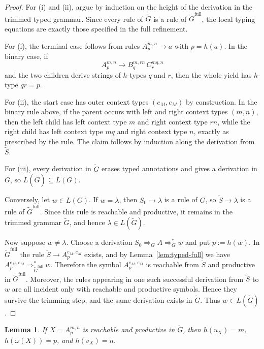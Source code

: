 \documentclass[11pt,a4paper]{article}
\newtheorem{lemma}[theorem]{Lemma}
\begin{document}
\begin{proof}
For \textup{(i)} and \textup{(ii)}, argue by induction on the height of
the derivation in the trimmed typed grammar. Since every rule of
$\widetilde G$ is a rule of $\widetilde G^{\mathrm{full}}$, the local
typing equations are exactly those specified in the full refinement.

For \textup{(i)}, the terminal case follows from rules
$A_p^{m,n}\to a$ with $p=h(a)$. In the binary case, if
\[
  A_p^{m,n}\to B_q^{m,rn}\,C_r^{mq,n}
\]
and the two children derive strings of $h$-types $q$ and $r$, then the
whole yield has $h$-type $qr=p$.

For \textup{(ii)}, the start case has outer context types
$(e_M,e_M)$ by construction. In the binary rule above, if the parent
occurs with left and right context types $(m,n)$, then the left child
has left context type $m$ and right context type $rn$, while the right
child has left context type $mq$ and right context type $n$, exactly as
prescribed by the rule. The claim follows by induction along the
derivation from $\widetilde S$.

For \textup{(iii)}, every derivation in $\widetilde G$ erases typed
annotations and gives a derivation in $G$, so
$L(\widetilde G)\subseteq L(G)$.

Conversely, let $w\in L(G)$. If $w=\lambda$, then $S_0\to\lambda$ is a
rule of $G$, so $\widetilde S\to\lambda$ is a rule of
$\widetilde G^{\mathrm{full}}$. Since this rule is reachable and
productive, it remains in the trimmed grammar $\widetilde G$, and hence
$\lambda\in L(\widetilde G)$.

Now suppose $w\neq\lambda$. Choose a derivation
$S_0\Rightarrow_G A\Rightarrow_G^* w$ and put $p:=h(w)$. In
$\widetilde G^{\mathrm{full}}$ the rule
$\widetilde S\to A_p^{e_M,e_M}$ exists, and by
Lemma~\ref{lem:typed-full} we have
$A_p^{e_M,e_M}\Rightarrow_{\widetilde G^{\mathrm{full}}}^* w$.
Therefore the symbol $A_p^{e_M,e_M}$ is reachable from $\widetilde S$
and productive in $\widetilde G^{\mathrm{full}}$. Moreover, the rules
appearing in one such successful derivation from $\widetilde S$ to $w$
are all incident only with reachable and productive symbols. Hence they
survive the trimming step, and the same derivation exists in
$\widetilde G$. Thus $w\in L(\widetilde G)$.
\end{proof}


\begin{lemma}\label{lem:typed-data}
If $X=A_p^{m,n}$ is reachable and productive in $\widetilde G$, then
$h(u_X)=m$, $h(\omega(X))=p$, and $h(v_X)=n$.
\end{lemma}
\end{document}
